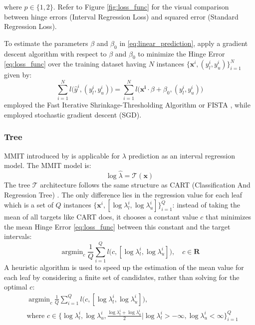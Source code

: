 \documentclass[12pt]{article}
\DeclareMathOperator*{\argmin}{argmin}
\begin{document}
\noindent where $p \in \{1, 2\}$. Refer to Figure \ref{fig:loss_func} for the visual comparison between hinge errors (Interval Regression Loss) and squared error (Standard Regression Loss).

To estimate the parameters $\beta$ and $\beta_0$ in \eqref{eq:linear_prediction}, apply a gradient descent algorithm with respect to $\beta$ and $\beta_0$ to minimize the Hinge Error \eqref{eq:loss_func} over the training dataset having $N$ instances $\{\mathbf{x}^i, (y_l^i, y_u^i)\}_{i=1}^N$ given by:
\begin{equation*}
    \sum_{i = 1}^N l\Big(\hat{y}^i, (y_l^i, y_u^i)\Big) = \sum_{i = 1}^N l\Big(\mathbf{x^i} \cdot \beta + \beta_0, (y_l^i, y_u^i)\Big)
\end{equation*}
\citet{rigaill:13} employed the Fast Iterative Shrinkage-Thresholding Algorithm or FISTA \citep{fista}, while \citet{rit} employed stochastic gradient descent (SGD).

\subsubsection{Tree} MMIT introduced by \citet{mmit} is applicable for $\lambda$ prediction as an interval regression model. 
The MMIT model is:
\[
\log \hat{\lambda} = \mathcal{T}(\mathbf{x})
\]
The tree $\mathcal{T}$ architecture follows the same structure as CART (Classification And Regression Tree) \citep{cart}. 
The only difference lies in the regression value for each leaf which is a set of $Q$ instances $\{\mathbf{x}^i, [\log \lambda_l^i,\log \lambda_u^i]\}_{i=1}^Q$: instead of taking the mean of all targets like CART does, it chooses a constant value $c$ that minimizes the mean Hinge Error \eqref{eq:loss_func} between this constant and the target intervals:
\begin{equation*}
    \argmin_c \frac{1}{Q} \sum_{i=1}^{Q} l\big(c, [\log \lambda_l^i, \log \lambda_u^i]\big), \quad c \in \mathbf{R}
\end{equation*}
\noindent A heuristic algorithm is used to speed up the estimation of the mean value for each leaf by considering a finite set of candidates, rather than solving for the optimal $c$:
\begin{align*}
    &\argmin_c \frac{1}{Q} \sum_{i=1}^{Q} l\big(c, [\log \lambda_l^i, \log \lambda_u^i]\big), 
    \\
    &\text{where }c \in \{\log \lambda_l^i, \log \lambda_u^i, \frac{\log \lambda_l^i + \log \lambda_u^i}{2}|\log \lambda_l^i > -\infty, \log \lambda_u^i < \infty\}_{i = 1}^Q
\end{align*}
\end{document}
